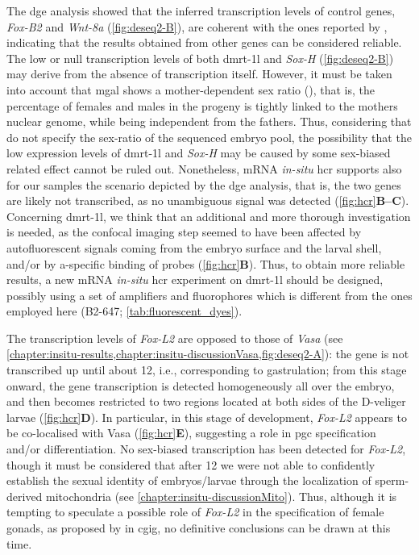 The \gls{dge} analysis showed that the inferred transcription levels of control genes, \textit{Fox-B2} and \textit{Wnt-8a} (\cref{fig:deseq2-B}), are coherent with the ones reported by , indicating that the results obtained from other genes can be considered reliable. The low or null transcription levels of both \gls{dmrt-1l} and \textit{Sox-H} (\cref{fig:deseq2-B}) may derive from the absence of transcription itself. However, it must be taken into account that \gls{mgal} shows a mother-dependent sex ratio (), that is, the percentage of females and males in the progeny is tightly linked to the mother\curlyapostrophe s nuclear genome, while being independent from the father\curlyapostrophe s. Thus, considering that  do not specify the sex-ratio of the sequenced embryo pool, the possibility that the low expression levels of \gls{dmrt-1l} and \textit{Sox-H} may be caused by some sex-biased related effect cannot be ruled out. Nonetheless, mRNA \textit{in-situ} \gls{hcr} supports also for our samples the scenario depicted by the \gls{dge} analysis, that is, the two genes are likely not transcribed, as no unambiguous signal was detected (\cref{fig:hcr}\textbf{B--C}). Concerning \gls{dmrt-1l}, we think that an additional and more thorough investigation is needed, as the confocal imaging step seemed to have been affected by autofluorescent signals coming from the embryo surface and the larval shell, and/or by a-specific binding  of probes (\cref{fig:hcr}\textbf{B}). Thus, to obtain more reliable results, a new mRNA \textit{in-situ} \gls{hcr} experiment on \gls{dmrt-1l} should be designed, possibly using a set of amplifiers and fluorophores which is different from the ones employed here (B2-647; \cref{tab:fluorescent_dyes}).

The transcription levels of \textit{Fox-L2} are opposed to those of \textit{Vasa} (see \cref{chapter:insitu-results,chapter:insitu-discussionVasa,fig:deseq2-A}): the gene is not transcribed up until about \qty{12}{\hpf}, i.e., corresponding to gastrulation; from this stage onward, the gene transcription is detected homogeneously all over the embryo, and then becomes restricted to two regions located at both sides of the D-veliger larvae (\cref{fig:hcr}\textbf{D}). In particular, in this stage of development, \textit{Fox-L2} appears to be co-localised with Vasa (\cref{fig:hcr}\textbf{E}), suggesting a role in \gls{pgc} specification and/or differentiation. No sex-biased transcription has been detected for \textit{Fox-L2}, though it must be considered that after \qty{12}{\hpf} we were not able to confidently establish the sexual identity of embryos/larvae through the localization of sperm-derived mitochondria (see \cref{chapter:insitu-discussionMito}). Thus, although it is tempting to speculate a possible role of \textit{Fox-L2} in the specification of female gonads, as proposed by  in \gls{cgig}, no definitive conclusions can be drawn at this time.

